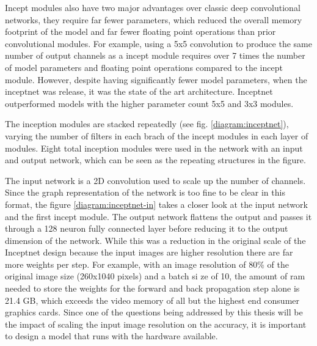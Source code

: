 Incept modules also have two major advantages over classic deep convolutional networks, they require far fewer parameters, which reduced the overall memory footprint of the model and far fewer floating point operations than prior convolutional modules. For example, using a 5x5 convolution to produce the same number of output channels as a incept module requires over 7 times the number of model parameters and floating point operations compared to the incept module. However, despite having significantly fewer model parameters, when the inceptnet was release, it was the state of the art architecture. Inceptnet outperformed models with the higher parameter count 5x5 and 3x3 modules.

The inception modules are stacked repeatedly (see fig. \ref{diagram:inceptnet}), varying the number of filters in each brach of the incept modules in each layer of modules. Eight total inception modules were used in the network with an input and output network, which can be seen as the repeating structures in the figure.

The input network is a 2D convolution used to scale up the number of channels. Since the graph representation of the network is too fine to be clear in this format, the figure \ref{diagram:inceptnet-in} takes a closer look at the input network and the first incept module. The output network flattens the output and passes it through a 128 neuron fully connected layer before reducing it to the output dimension of the network. While this was a reduction in the original scale of the Inceptnet design because the input images are higher resolution there are far more weights per step. For example, with an image resolution of 80\% of the original image size (260x1040 pixels) and a batch si ze of 10, the amount of ram needed to store the weights for the forward and back propagation step alone is 21.4 GB, which exceeds the video memory of all but the highest end consumer graphics cards. Since one of the questions being addressed by this thesis will be the impact of scaling the input image resolution on the accuracy, it is important to design a model that runs with the hardware available.

